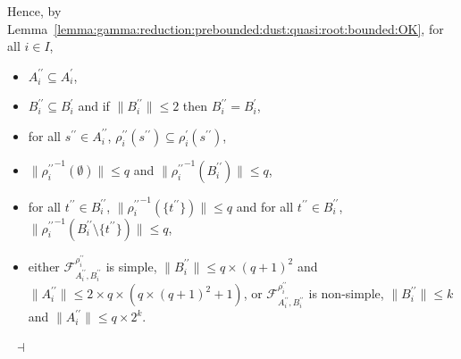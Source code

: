 \documentclass[draft]{article}
\newenvironment{proof}{{\bf Proof:}}{~$\dashv$\\}
\begin{document}
\begin{proof}
Hence, by Lemma~\ref{lemma:gamma:reduction:prebounded:dust:quasi:root:bounded:OK}, for all $i{\in}I$,
%
%
\begin{itemize}
%
%
\item $A_{i}^{\prime\prime}{\subseteq}A_{i}^{\prime}$,
%
%
\item $B_{i}^{\prime\prime}{\subseteq}B_{i}^{\prime}$ and if ${\parallel}B_{i}^{\prime\prime}{\parallel}{\leq}2$ then $B_{i}^{\prime\prime}{=}B_{i}^{\prime}$,
%
%
\item for all $s^{\prime\prime}{\in}A_{i}^{\prime\prime}$, $\rho_{i}^{\prime\prime}(s^{\prime\prime}){\subseteq}\rho_{i}^{\prime}(s^{\prime\prime})$,
%
%
\item ${\parallel}{\rho_{i}^{\prime\prime}}^{{-}1}(\emptyset){\parallel}{\leq}q$ and ${\parallel}{\rho_{i}^{\prime\prime}}^{{-}1}(B_{i}^{\prime\prime}){\parallel}{\leq}q$,
%
%
\item for all $t^{\prime\prime}{\in}B_{i}^{\prime\prime}$, ${\parallel}{\rho_{i}^{\prime\prime}}^{{-}1}(\{t^{\prime\prime}\}){\parallel}{\leq}q$ and for all $t^{\prime\prime}{\in}B_{i}^{\prime\prime}$, ${\parallel}{\rho_{i}^{\prime\prime}}^{{-}1}(B_{i}^{\prime\prime}{\setminus}\{t^{\prime\prime}\}){\parallel}{\leq}q$,
%
%
\item either ${\mathcal F}_{A_{i}^{\prime\prime},B_{i}^{\prime\prime}}^{\rho_{i}^{\prime\prime}}$ is simple, ${\parallel}B_{i}^{\prime\prime}{\parallel}{\leq}q{\times}(q{+}1)^{2}$ and ${\parallel}A_{i}^{\prime\prime}{\parallel}{\leq}2{\times}q{\times}(q{\times}(q{+}1)^{2}+1)$, or ${\mathcal F}_{A_{i}^{\prime\prime},B_{i}^{\prime\prime}}^{\rho_{i}^{\prime\prime}}$ is non-simple, ${\parallel}B_{i}^{\prime\prime}{\parallel}{\leq}k$ and ${\parallel}A_{i}^{\prime\prime}{\parallel}{\leq}q{\times}2^{k}$.

\end{itemize}
\end{proof}
\end{document}

